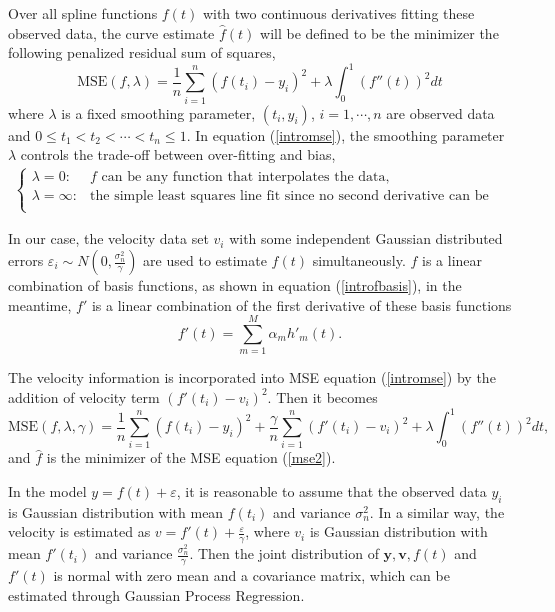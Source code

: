 Over all spline functions $f(t)$ with two continuous derivatives fitting these observed data, the curve estimate  $\hat{f}(t)$ will be defined to be the minimizer the following penalized residual sum of squares, 
\begin{equation}\label{intromse}
\text{MSE}(f,\lambda)=\frac{1}{n}\sum_{i=1}^n(f(t_i)-y_i)^2+\lambda \int_{0}^{1}(f''(t))^2dt
\end{equation}
where $\lambda$ is a fixed smoothing parameter, $(t_i,y_i)$, $i=1, \cdots, n$ are observed data and $0 \leq t_1< t_2 < \cdots <t_n \leq 1$. In equation (\ref{intromse}),  the smoothing parameter $\lambda$ controls the trade-off between over-fitting and bias,
\begin{align}
\begin{cases}
\lambda = 0 : & \mbox{$f$ can be any function that interpolates the data,}\\
\lambda = \infty: & \mbox{the simple least squares line fit since no second derivative can be tolerated.}\\
\end{cases}
\end{align}

In our case, the velocity data set $v_i$ with some independent Gaussian distributed errors $\varepsilon_i \sim N(0, \frac{\sigma_n^2}{\gamma})$ are used to estimate $f(t)$ simultaneously. $f$ is a linear combination of basis functions, as shown in equation (\ref{introfbasis}), in the meantime, $f'$ is a linear combination of the first derivative of these basis functions
\begin{equation}
f'(t) =\sum_{m=1}^{M}\alpha_mh'_m(t).
\end{equation}

The velocity information  is incorporated into MSE  equation (\ref{intromse}) by the addition of velocity term $(f'(t_i)-v_i)^2$. Then it becomes 
\begin{equation}\label{mse2}
\text{MSE}(f,\lambda,\gamma)=\frac{1}{n}\sum_{i=1}^n(f(t_i)-y_i)^2+\frac{\gamma}{n} \sum_{i=1}^n(f'(t_i)-v_i)^2+\lambda \int_{0}^{1}(f''(t))^2dt,
\end{equation}
and $\hat{f}$ is the minimizer of the MSE equation (\ref{mse2}).

In the model $y=f(t)+\varepsilon$, it is reasonable to assume that the observed data $y_i$ is Gaussian distribution with mean $f(t_i)$ and variance $\sigma_n^2$. In a similar way, the velocity is estimated as  $v=f'(t)+\frac{\varepsilon}{\gamma}$, where $v_i$ is Gaussian distribution with mean $f'(t_i)$ and variance $\frac{\sigma_n^2}{\gamma}$. Then the joint distribution of $\mathbf{y},\mathbf{v},f(t)$ and $f'(t)$ is normal with zero mean and a covariance matrix, which can be estimated through Gaussian Process Regression.


